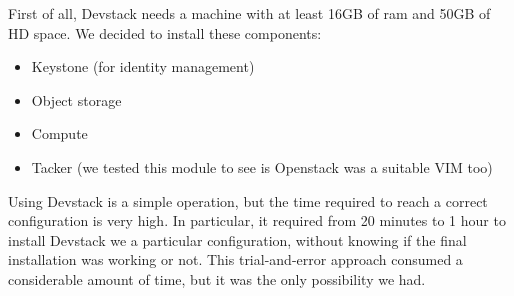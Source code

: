 First of all, Devstack needs a machine with at least 16GB of ram and 50GB of HD 
space.
We decided to install these components:
\begin{itemize}
 \item Keystone (for identity management)
 \item Object storage
 \item Compute
 \item Tacker (we tested this module to see is Openstack was a suitable VIM too)
\end{itemize}

Using Devstack is a simple operation, but the time required to reach a correct 
configuration is very high. In particular, it required from 20 minutes to 1 
hour to install Devstack we a particular configuration, without knowing if the 
final installation was working or not. This trial-and-error approach consumed a 
considerable amount of time, but it was the only possibility we had.
